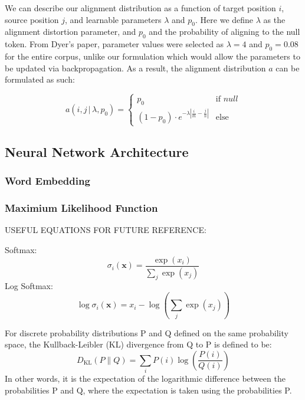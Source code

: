 \documentclass[twoside,twocolumn]{article}
\renewcommand{\vec}[1]{\mathbf{#1}}
\begin{document}
We can describe our alignment distribution as a function of target position $i$, source position $j$, and learnable parameters $\lambda$ and $p_0$. Here we define $\lambda$ as the alignment distortion parameter, and $p_0$ and the probability of aligning to the null token. From Dyer's paper, parameter values were selected as $\lambda=4$ and $p_0=0.08$ for the entire corpus, unlike our formulation which would allow the parameters to be updated via backpropagation. As a result, the alignment distribution $a$ can be formulated as such:

\begin{equation}
a(i, j \, | \, \lambda, p_0) =
\begin{cases}
      p_0 & \text{if } null \\
     (1-p_0) \cdot e^{-\lambda | \frac{i}{m} - \frac{j}{n}|} & \text{else}
   \end{cases}
\end{equation}

\subsection{Neural Network Architecture}

\subsubsection{Word Embedding}

\subsubsection{Maximium Likelihood Function}




USEFUL EQUATIONS FOR FUTURE REFERENCE:

Softmax:
\begin{equation}
\sigma_i(\vec{x}) = \frac{\exp(x_i)}{\sum_j\exp(x_j)}
\end{equation}
Log Softmax: %
\begin{equation}
\log  \sigma_i(\vec{x})  = x_i - \log \left( \sum_j\exp(x_j) \right)
\end{equation}

For discrete probability distributions P and Q defined on the same probability space, the Kullback-Leibler (KL) divergence from Q to P is defined to be:
\begin{equation}
D _ { \mathrm { KL } } ( P \| Q ) = \sum _ { i } P ( i ) \log \left( \frac { P ( i ) } { Q ( i ) } \right)
\end{equation}
In other words, it is the expectation of the logarithmic difference between the probabilities P and Q, where the expectation is taken using the probabilities P.
\end{document}
